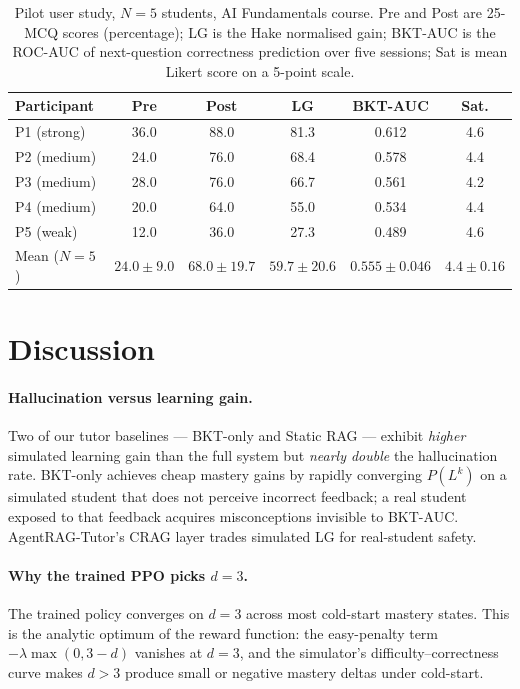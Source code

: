 \documentclass[conference]{IEEEtran}
\begin{document}
\begin{table}[H]
\caption{Pilot user study, $N{=}5$ students, AI Fundamentals course.
Pre and Post are 25-MCQ scores (percentage); LG is the Hake
normalised gain; BKT-AUC is the ROC-AUC of next-question correctness
prediction over five sessions; Sat is mean Likert score on a 5-point
scale.}
\label{tab:pilot}
\centering
\footnotesize
\setlength{\tabcolsep}{6pt}
\begin{tabular}{l c c c c c}
\toprule
Participant & Pre & Post & LG & BKT-AUC & Sat. \\
\midrule
P1 (strong) & 36.0 & 88.0 & 81.3 & 0.612 & 4.6 \\
P2 (medium) & 24.0 & 76.0 & 68.4 & 0.578 & 4.4 \\
P3 (medium) & 28.0 & 76.0 & 66.7 & 0.561 & 4.2 \\
P4 (medium) & 20.0 & 64.0 & 55.0 & 0.534 & 4.4 \\
P5 (weak)   & 12.0 & 36.0 & 27.3 & 0.489 & 4.6 \\
\midrule
Mean ($N{=}5$) & $24.0{\pm}9.0$ & $68.0{\pm}19.7$ & $59.7{\pm}20.6$ & $0.555{\pm}0.046$ & $4.4{\pm}0.16$ \\
\bottomrule
\end{tabular}
\end{table}


\FloatBarrier
\section{Discussion}\label{sec:discuss}

\paragraph{Hallucination versus learning gain.}
Two of our tutor baselines --- BKT-only and Static RAG --- exhibit
\emph{higher} simulated learning gain than the full system but
\emph{nearly double} the hallucination rate. BKT-only achieves cheap
mastery gains by rapidly converging $P(L^k)$ on a simulated student
that does not perceive incorrect feedback; a real student exposed to
that feedback acquires misconceptions invisible to BKT-AUC.
AgentRAG-Tutor's CRAG layer trades simulated LG for real-student
safety.

\paragraph{Why the trained PPO picks $d=3$.}
The trained policy converges on $d=3$ across most cold-start mastery
states. This is the analytic optimum of the reward function: the
easy-penalty term $-\lambda\max(0, 3-d)$ vanishes at $d=3$, and the
simulator's difficulty--correctness curve makes $d>3$ produce small
or negative mastery deltas under cold-start.
\end{document}
